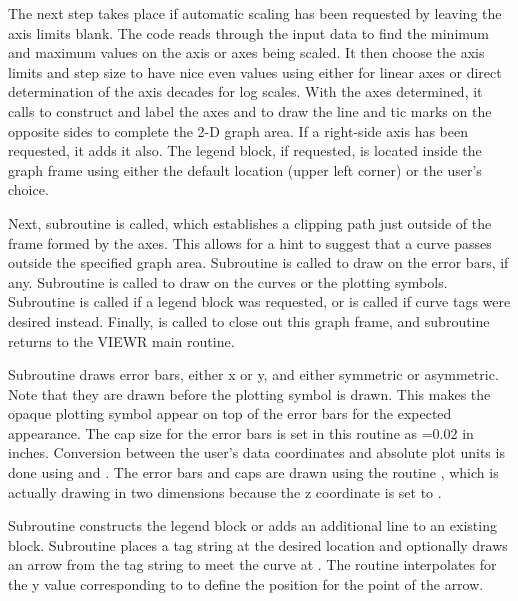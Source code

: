 The next step takes place if automatic scaling has been requested by
leaving the axis limits blank.  The code reads through the input
data to find the minimum and maximum values on the axis or axes
being scaled.  It then choose the axis limits and step size to have
nice even values using either 
for linear axes or direct determination of the axis decades for
log scales.  With the axes determined, it calls
 to construct and label the
axes and to draw the line and tic marks on the opposite sides to
complete the 2-D graph area.  If a right-side axis has been
requested, it adds it also.  The legend block, if requested, is
located inside the graph frame using either the default location
(upper left corner) or the user's  choice.

Next, subroutine 
is called, which establishes a clipping path just outside of
the frame formed by the axes.  This allows for a hint to suggest
that a curve passes outside the specified graph area.  Subroutine
 is called to draw
on the error bars, if any.  Subroutine
 is called to
draw on the curves or the plotting symbols.  Subroutine
is called if a legend block was requested, or
 is called
if curve tags were desired instead.  Finally,
 is called
to close out this graph frame, and subroutine 
returns to the VIEWR main routine.

Subroutine 
draws error bars, either x or y, and either
symmetric or asymmetric.  Note that they are drawn before the
plotting symbol is drawn.  This makes the opaque plotting symbol
appear on top of the error bars for the expected appearance.
The cap size for the error bars is set in this routine as
=0.02 in inches.  Conversion between the user's data
coordinates and absolute plot units is done using 
and .  The error bars and caps are drawn using the
routine , which is actually drawing in two dimensions
because the z coordinate is set to .

Subroutine  constructs
the legend block or adds an additional line to an existing block.
Subroutine  places a
tag string at the desired location  and optionally
draws an arrow from the tag string to meet the curve at .
The routine interpolates for the y value corresponding to 
to define the position for the point of the arrow.

